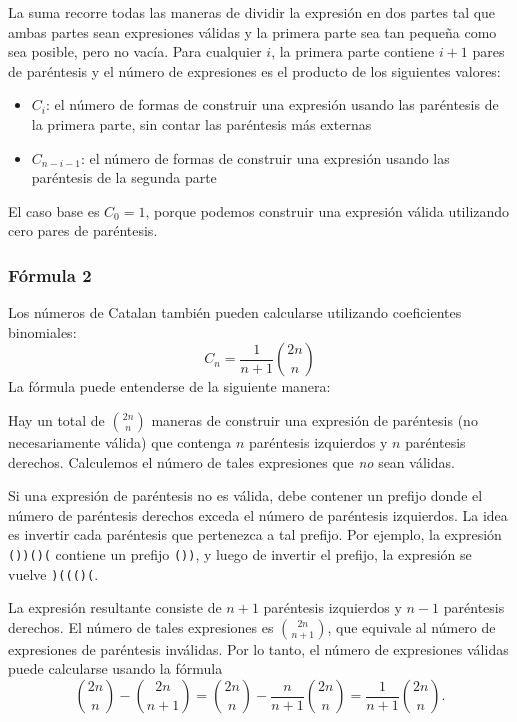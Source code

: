 La suma recorre todas las maneras de dividir la expresión en dos partes tal
que ambas partes sean expresiones válidas y la primera parte sea tan pequeña
como sea posible, pero no vacía. Para cualquier $i$, la primera parte contiene
$i+1$ pares de paréntesis y el número de expresiones es el producto de los
siguientes valores:

\begin{itemize}
    \item $C_{i}$: el número de formas de construir una expresión
          usando las paréntesis de la primera parte, sin contar
          las paréntesis más externas
    \item $C_{n-i-1}$: el número de formas de construir una expresión
          usando las paréntesis de la segunda parte
\end{itemize}

El caso base es $C_0=1$, porque podemos construir una expresión válida
utilizando cero pares de paréntesis.

\subsubsection{Fórmula 2}

Los números de Catalan también pueden calcularse utilizando coeficientes
binomiales:
\[ C_n = \frac{1}{n+1} \binom{2n}{n}\]
La fórmula puede entenderse de la siguiente manera:

Hay un total de $\binom{2n}{n}$ maneras de construir una expresión de
paréntesis (no necesariamente válida) que contenga $n$ paréntesis izquierdos
y $n$ paréntesis derechos. Calculemos el número de tales expresiones que
\emph{no} sean válidas.

Si una expresión de paréntesis no es válida, debe contener un prefijo donde
el número de paréntesis derechos exceda el número de paréntesis izquierdos.
La idea es invertir cada paréntesis que pertenezca a tal prefijo. Por ejemplo,
la expresión \texttt{())()(} contiene un prefijo \texttt{())}, y luego de
invertir el prefijo, la expresión se vuelve \texttt{)((()(}.

La expresión resultante consiste de $n+1$ paréntesis izquierdos y $n-1$
paréntesis derechos. El número de tales expresiones es $\binom{2n}{n+1}$,
que equivale al número de expresiones de paréntesis inválidas. Por lo tanto,
el número de expresiones válidas puede calcularse usando la fórmula
\[\binom{2n}{n}-\binom{2n}{n+1} = \binom{2n}{n} - \frac{n}{n+1} \binom{2n}{n} = \frac{1}{n+1} \binom{2n}{n}.\]

